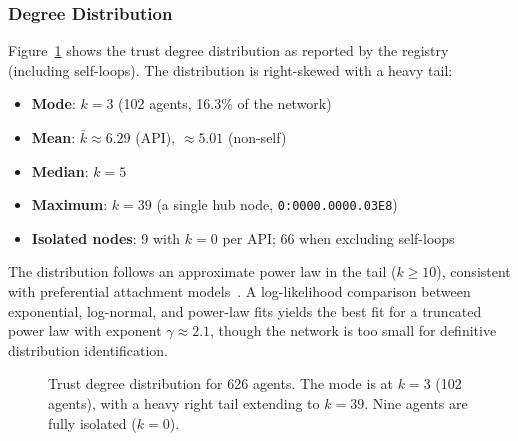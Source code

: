 \documentclass[11pt,twocolumn]{article}
\begin{document}
\subsubsection{Degree Distribution}

Figure~\ref{fig:degree-dist} shows the trust degree distribution as reported by the registry (including self-loops). The distribution is right-skewed with a heavy tail:

\begin{itemize}[leftmargin=*,nosep]
    \item \textbf{Mode}: $k=3$ (102 agents, 16.3\% of the network)
    \item \textbf{Mean}: $\bar{k} \approx 6.29$ (API), $\approx 5.01$ (non-self)
    \item \textbf{Median}: $k=5$
    \item \textbf{Maximum}: $k=39$ (a single hub node, \texttt{0:0000.0000.03E8})
    \item \textbf{Isolated nodes}: 9 with $k=0$ per API; 66 when excluding self-loops
\end{itemize}

The distribution follows an approximate power law in the tail ($k \geq 10$), consistent with preferential attachment models~\citep{barabasi1999emergence}. A log-likelihood comparison between exponential, log-normal, and power-law fits yields the best fit for a truncated power law with exponent $\gamma \approx 2.1$, though the network is too small for definitive distribution identification.

\begin{figure}[t]
\centering
{}
\caption{Trust degree distribution for 626 agents. The mode is at $k=3$ (102 agents), with a heavy right tail extending to $k=39$. Nine agents are fully isolated ($k=0$).}
\label{fig:degree-dist}
\end{figure}
\end{document}
